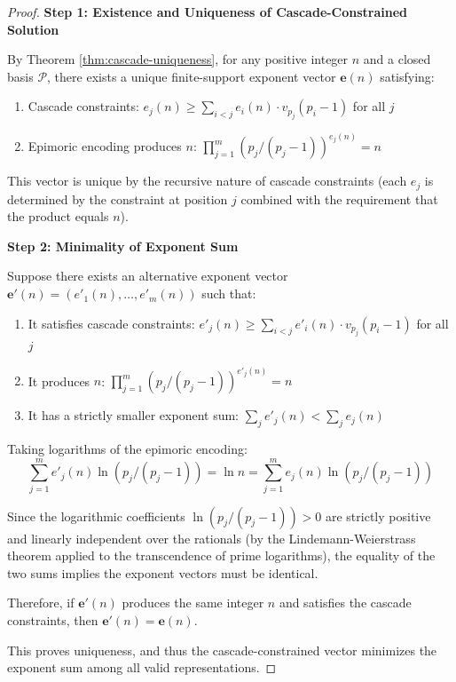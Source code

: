 \begin{proof}

\noindent \textbf{Step 1: Existence and Uniqueness of Cascade-Constrained Solution}

By Theorem \ref{thm:cascade-uniqueness}, for any positive integer $n$ and a closed basis $\mathcal{P}$, there exists a unique finite-support exponent vector $\mathbf{e}(n)$ satisfying:
\begin{enumerate}
\item Cascade constraints: $e_j(n) \geq \sum_{i<j} e_i(n) \cdot v_{p_j}(p_i - 1)$ for all $j$
\item Epimoric encoding produces $n$: $\prod_{j=1}^m (p_j/(p_j-1))^{e_j(n)} = n$
\end{enumerate}

This vector is unique by the recursive nature of cascade constraints (each $e_j$ is determined by the constraint at position $j$ combined with the requirement that the product equals $n$).

\noindent \textbf{Step 2: Minimality of Exponent Sum}

Suppose there exists an alternative exponent vector $\mathbf{e}'(n) = (e'_1(n), \ldots, e'_m(n))$ such that:
\begin{enumerate}
\item It satisfies cascade constraints: $e'_j(n) \geq \sum_{i<j} e'_i(n) \cdot v_{p_j}(p_i - 1)$ for all $j$
\item It produces $n$: $\prod_{j=1}^m (p_j/(p_j-1))^{e'_j(n)} = n$
\item It has a strictly smaller exponent sum: $\sum_j e'_j(n) < \sum_j e_j(n)$
\end{enumerate}

Taking logarithms of the epimoric encoding:
\begin{equation}
\sum_{j=1}^m e'_j(n) \ln(p_j/(p_j-1)) = \ln n = \sum_{j=1}^m e_j(n) \ln(p_j/(p_j-1))
\end{equation}

Since the logarithmic coefficients $\ln(p_j/(p_j-1)) > 0$ are strictly positive and linearly independent over the rationals (by the Lindemann-Weierstrass theorem applied to the transcendence of prime logarithms), the equality of the two sums implies the exponent vectors must be identical.

Therefore, if $\mathbf{e}'(n)$ produces the same integer $n$ and satisfies the cascade constraints, then $\mathbf{e}'(n) = \mathbf{e}(n)$.

This proves uniqueness, and thus the cascade-constrained vector minimizes the exponent sum among all valid representations.


\end{proof}
